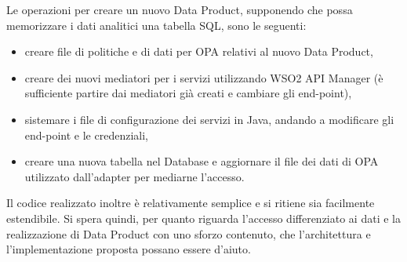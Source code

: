 \documentclass[a4paper,12pt]{report}
\begin{document}
Le operazioni per creare un nuovo Data Product, supponendo che possa memorizzare i dati analitici una tabella SQL, sono le seguenti: 
\begin{itemize}
    \item creare file di politiche e di dati per OPA relativi al nuovo Data Product,
    \item creare dei nuovi mediatori per i servizi utilizzando WSO2 API Manager (è sufficiente partire dai mediatori già creati e cambiare gli end-point),
    \item sistemare i file di configurazione dei servizi in Java, andando a modificare gli end-point e le credenziali,
    \item creare una nuova tabella nel Database e aggiornare il file dei dati di OPA utilizzato dall'adapter per mediarne l'accesso.
\end{itemize} 
Il codice realizzato inoltre è relativamente semplice e si ritiene sia facilmente estendibile.
Si spera quindi, per quanto riguarda l'accesso differenziato ai dati e la realizzazione di Data Product con uno sforzo contenuto, che l'architettura e l'implementazione proposta possano essere d'aiuto.
\end{document}

